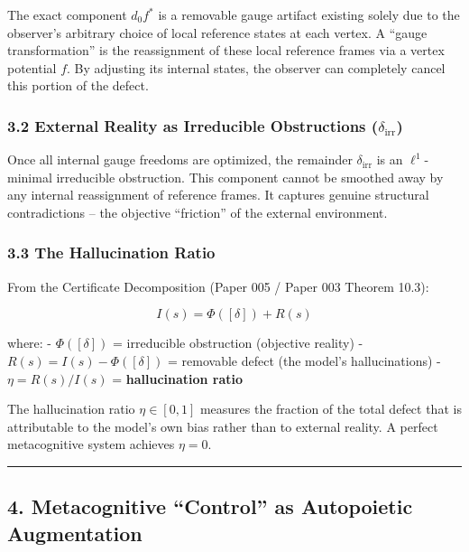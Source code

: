 \documentclass[
]{article}
\begin{document}
The exact component \(d_0 f^*\) is a removable gauge artifact existing
solely due to the observer's arbitrary choice of local reference states
at each vertex. A ``gauge transformation'' is the reassignment of these
local reference frames via a vertex potential \(f\). By adjusting its
internal states, the observer can completely cancel this portion of the
defect.

\subsubsection{\texorpdfstring{3.2 External Reality as Irreducible
Obstructions
(\(\delta_{\mathrm{irr}}\))}{3.2 External Reality as Irreducible Obstructions (\textbackslash delta\_\{\textbackslash mathrm\{irr\}\})}}\label{external-reality-as-irreducible-obstructions-delta_mathrmirr}

Once all internal gauge freedoms are optimized, the remainder
\(\delta_{\mathrm{irr}}\) is an \(\ell^1\)-minimal irreducible
obstruction. This component cannot be smoothed away by any internal
reassignment of reference frames. It captures genuine structural
contradictions -- the objective ``friction'' of the external
environment.

\subsubsection{3.3 The Hallucination
Ratio}\label{the-hallucination-ratio}

From the Certificate Decomposition (Paper 005 / Paper 003 Theorem 10.3):

\[I(s) = \Phi([\delta]) + R(s)\]

where: - \(\Phi([\delta])\) = irreducible obstruction (objective
reality) - \(R(s) = I(s) - \Phi([\delta])\) = removable defect (the
model's hallucinations) - \(\eta = R(s) / I(s)\) = \textbf{hallucination
ratio}

The hallucination ratio \(\eta \in [0, 1]\) measures the fraction of the
total defect that is attributable to the model's own bias rather than to
external reality. A perfect metacognitive system achieves \(\eta = 0\).

\begin{center}\rule{0.5\linewidth}{0.5pt}\end{center}

\subsection{4. Metacognitive ``Control'' as Autopoietic
Augmentation}\label{metacognitive-control-as-autopoietic-augmentation}
\end{document}
